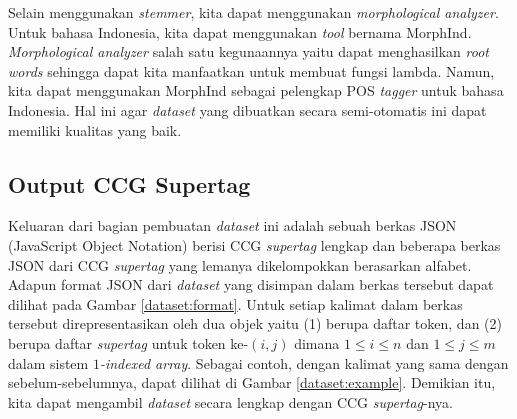 Selain menggunakan \textit{stemmer}, kita dapat menggunakan \textit{morphological analyzer}.
Untuk bahasa Indonesia, kita dapat menggunakan \textit{tool} bernama MorphInd\footnotemark[3].
\textit{Morphological analyzer} salah satu kegunaannya yaitu dapat menghasilkan \textit{root words}
sehingga dapat kita manfaatkan untuk membuat fungsi lambda.
Namun, kita dapat menggunakan MorphInd sebagai pelengkap POS \textit{tagger} untuk bahasa Indonesia.
Hal ini agar \textit{dataset} yang dibuatkan secara semi-otomatis ini dapat memiliki kualitas yang
baik.


\subsection{Output CCG Supertag}

Keluaran dari bagian pembuatan \textit{dataset} ini adalah sebuah berkas JSON
(JavaScript Object Notation) berisi CCG \textit{supertag} lengkap dan beberapa berkas JSON dari CCG
\textit{supertag} yang lemanya dikelompokkan berasarkan alfabet.
Adapun format JSON dari \textit{dataset} yang disimpan dalam berkas tersebut dapat dilihat pada Gambar
\ref{dataset:format}.
Untuk setiap kalimat dalam berkas tersebut direpresentasikan oleh dua objek yaitu
(1)  berupa daftar token, dan
(2)  berupa daftar \textit{supertag} untuk token ke-$(i, j)$ dimana $1 \leq i \leq n$
dan $1 \leq j \leq m$ dalam sistem \textit{$1$-indexed array}.
Sebagai contoh, dengan kalimat yang sama dengan sebelum-sebelumnya, dapat dilihat di Gambar
\ref{dataset:example}.
Demikian itu, kita dapat mengambil \textit{dataset} secara lengkap dengan CCG \textit{supertag}-nya.

